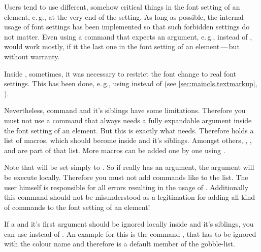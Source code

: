 Users tend to use different, somehow critical things in the font setting of an
element, e.\,g.,  at the very end of the setting. As long
as possible, the internal usage of font settings has been implemented so that
such forbidden settings do not matter. Even using a command that expects an
argument, e.\,g.,  instead of ,  would work
mostly, if it the last one in the font setting of an element\,---\,but without
warranty.

Inside \KOMAScript, sometimes, it was necessary to restrict the font change
to real font settings. This has been done, e.\,g., using
%
%
%
%
 instead of  (see
\autoref{sec:maincls.textmarkup},
).

Nevertheless, command  and it's siblings have some
limitations. Therefore you must not use a command that always needs a fully
expandable argument inside the font setting of an element. But this is exactly
what 
needs. Therefore \KOMAScript{} holds a list of macros, which should become
 inside  and it's siblings. Amongst
others, , , and
 are part of that list. More macros can be added one by
one using .

Note that  will be set simply to . So if
 really has an argument, the argument will be execute
locally. Therefore you must not add commands like  to the
list. The user himself is responsible for all errors resulting in the usage of
. Additionally this command should not be
misunderstood as a legitimation for adding all kind of commands to the font
setting of an element!

If a  and it's first argument should be ignored
locally inside  and it's siblings, you can use
 instead of . An
example for this is the command , that has to be ignored with the
colour name and therefore is a default member of the gobble-list.%
%
%


